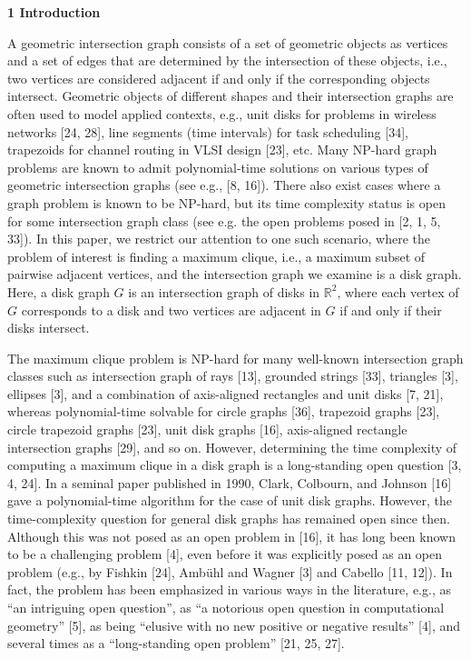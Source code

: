 \par\medskip\noindent\textbf{1 Introduction}\par
A geometric intersection graph consists of a set of geometric objects as vertices and a set of edges that are determined by the intersection of these objects, i.e., two vertices are considered adjacent if and only if the corresponding objects intersect. Geometric objects of different shapes and their intersection graphs are often used to model applied contexts, e.g., unit disks for problems in wireless networks [24, 28], line segments (time intervals) for task scheduling [34], trapezoids for channel routing in VLSI design [23], etc. Many NP-hard graph problems are known to admit polynomial-time solutions on various types of geometric intersection graphs (see e.g., [8, 16]). There also exist cases where a graph problem is known to be NP-hard, but its time complexity status is open for some intersection graph class (see e.g. the open problems posed in [2, 1, 5, 33]). In this paper, we restrict our attention to one such scenario, where the problem of interest is finding a maximum clique, i.e., a maximum subset of pairwise adjacent vertices, and the intersection graph we examine is a disk graph. Here, a disk graph $G$ is an intersection graph of disks in $\mathbb{R}^{2}$, where each vertex of $G$ corresponds to a disk and two vertices are adjacent in $G$ if and only if their disks intersect.
\par
\par
The maximum clique problem is NP-hard for many well-known intersection graph classes such as intersection graph of rays [13], grounded strings [33], triangles [3], ellipses [3], and a combination of axis-aligned rectangles and unit disks [7, 21], whereas polynomial-time solvable for circle graphs [36], trapezoid graphs [23], circle trapezoid graphs [23], unit disk graphs [16], axis-aligned rectangle intersection graphs [29], and so on. However, determining the time complexity of computing a maximum clique in a disk graph is a long-standing open question [3, 4, 24]. In a seminal paper published in 1990, Clark, Colbourn, and Johnson [16] gave a polynomial-time algorithm for the case of unit disk graphs. However, the time-complexity question for general disk graphs has remained open since then. Although this was not posed as an open problem in [16], it has long been known to be a challenging problem [4], even before it was explicitly posed as an open problem (e.g., by Fishkin [24], Ambühl and Wagner [3] and Cabello [11, 12]). In fact, the problem has been emphasized in various ways in the literature, e.g., as “an intriguing open question”, as “a notorious open question in computational geometry” [5], as being “elusive with no new positive or negative results” [4], and several times as a “long-standing open problem” [21, 25, 27].
